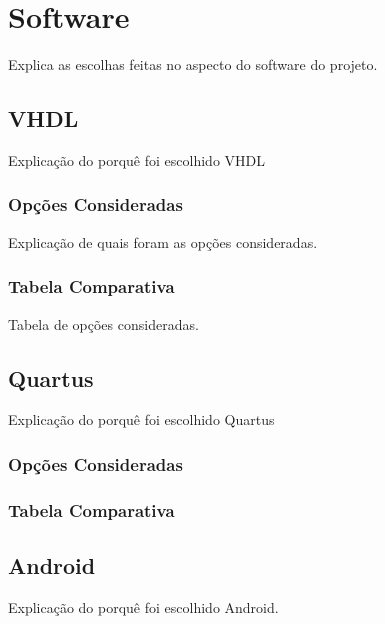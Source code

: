 	\section{Software}\label{sec-software}
	
	Explica as escolhas feitas no aspecto do software do projeto.
	
	\subsection{VHDL}\label{soft-vhdl}
	
	Explicação do porquê foi escolhido VHDL
	
	\subsubsection{Opções Consideradas}\label{vhdl-options}
	
	Explicação de quais foram as opções consideradas.
	
	\subsubsection{Tabela Comparativa}\label{vhdl-table}
	
	Tabela de opções consideradas.
	
	\subsection{Quartus}\label{soft-quartus}
	
	Explicação do porquê foi escolhido Quartus
	
	\subsubsection{Opções Consideradas}\label{quartus-options}

	
	\subsubsection{Tabela Comparativa}\label{quartus-table}
	
	
	\subsection{Android}\label{soft-android}
	
	Explicação do porquê foi escolhido Android.
